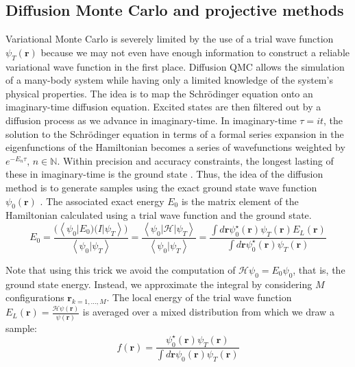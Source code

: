 \subsection{Diffusion Monte Carlo and projective methods}\label{subsec:dmc}

Variational Monte Carlo is severely limited by the use of a trial wave function $\psi_T (\bm r)$ because we may not even have enough information to construct a reliable variational wave function in the first place.
Diffusion \ac{QMC} allows the simulation of a many-body system while having only a limited knowledge of the system's physical properties.
The idea is to map the Schr\"odinger equation onto an imaginary-time diffusion equation.
Excited states are then filtered out by a diffusion process as we advance in imaginary-time.
In imaginary-time $\tau = i t$, the solution to the Schr\"odinger equation in terms of a formal series expansion in the eigenfunctions of the Hamiltonian becomes a series of  wavefunctions weighted by $e^{-E_n \tau}, \, n \in \mathbb{N}$.
Within precision and accuracy constraints, the longest lasting of these in imaginary-time is the ground state \cite{kosztin_introduction_1996}.
Thus, the idea of the diffusion method is to generate samples using the exact ground state wave function $\psi_0 (\bm r)$ \cite{toulouse_chapter_2016}.
The associated exact energy $E_0$ is the matrix element of the Hamiltonian calculated using a trial wave function and the ground state.
\begin{equation}\label{eq:GSenergy}
E_0 = \frac{ \big( \left\langle \psi_0 |E_0 \big) \big( I | \psi_T \right\rangle \big)}{\left\langle \psi_0 | \psi_T \right\rangle} = \frac{\left\langle \psi_0 | \mathcal{H} | \psi_T \right\rangle}{ \left\langle\psi_0 | \psi_T \right\rangle} = \frac{\int d\bm r \psi_0^\star (\bm r) \psi_T (\bm r) E_L (\bm r)}{\int d\bm r\psi_0^\star (\bm r) \psi_T (\bm r)}
\end{equation}

Note that using this trick we avoid the computation of $\mathcal{H} \psi_0 = E_0 \psi_0$, that is, the ground state energy.
Instead, we approximate the integral by considering $M$ configurations $\bm r_{k = 1,..., M}$.
The local energy of the trial wave function $E_L (\bm r) = \frac{\mathcal{H} \psi (\bm r)}{\psi (\bm r)}$ is averaged over a mixed distribution from which we draw a sample:
\begin{equation}
f(\bm r) = \frac{\psi_0^\star (\bm r) \psi_T (\bm r) }{ \int d\bm r  \psi_0 (\bm r) \psi_T (\bm r)}
\end{equation}

